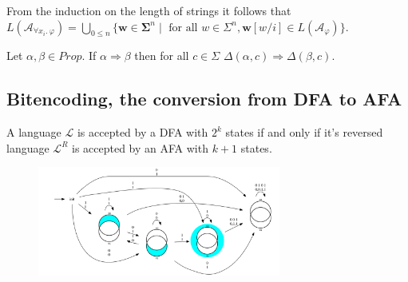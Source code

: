 From the induction on the length of strings it follows that
\(L(\mathcal{A}_{\forall x_i .\ \varphi}) = \bigcup\limits_{0 \leq n}\{
\mathbf{w} \in \boldsymbol{\Sigma}^n \mid \text{ for all } w \in \Sigma^n ,
\mathbf{w}[w/i]\in L(\mathcal{A}_{\varphi}) \} \).

\begin{lemma}
Let \(\alpha, \beta \in \mathit{Prop} \). If \( \alpha \Rightarrow \beta \) then for all
\( c \in \Sigma \) \( \Delta(\alpha, c) \Rightarrow \Delta(\beta, c) \).
\end{lemma}

\subsection{Bitencoding, the conversion from DFA to AFA}
\begin{theorem}
 A language \( \mathcal{L} \) is accepted by a DFA with
\( 2^k \) states if and only if it's reversed language \( \mathcal{L}^R \) is
accepted by an AFA with \( k + 1 \) states.
\end{theorem}

\begin{example}
  \begin{figure}
    \includegraphics[width=8cm]{images/afa}
  \end{figure}
\end{example}

